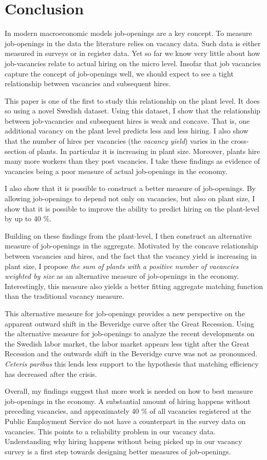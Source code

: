 \section{Conclusion}
\label{sec:conclusion}

In modern macroeconomic models job-openings are a key concept. To measure job-openings in the data the literature relies on vacancy data. Such data is either measured in surveys or in register data. Yet so far we know very little about how job-vacancies relate to actual hiring on the micro level. Insofar that job vacancies capture the concept of job-openings well, we should expect to see a tight relationship between vacancies and subsequent hires.
 
This paper is one of the first to study this relationship on the plant level. It does so using a novel Swedish dataset. Using this dataset, I show that the relationship between job-vacancies and subsequent hires is weak and concave. That is, one additional vacancy on the plant level predicts less and less hiring. I also show that the number of hires per vacancies (the \emph{vacancy yield}) varies in the cross-section of plants. In particular it is increasing in plant size. Moreover, plants hire many more workers than they post vacancies. I take these findings as evidence of vacancies being a poor measure of actual job-openings in the economy. 

I also show that it is possible to construct a better measure of job-openings. By allowing job-openings to depend not only on vacancies, but also on plant size, I show that it is possible to improve the ability to predict hiring on the plant-level by up to 40 \%. 

Building on these findings from the plant-level, I then construct an alternative measure of job-openings in the aggregate. Motivated by the concave relationship between vacancies and hires, and the fact that the vacancy yield is increasing in plant size, I propose \emph{the sum of plants with a positive number of vacancies weighted by size} as an alternative measure of job-openings in the economy. Interestingly, this measure also yields a better fitting aggregate matching function than the traditional vacancy measure.

This alternative measure for job-openings provides a new perspective on the apparent outward shift in the Beveridge curve after the Great Recession. Using the alternative measure for job-openings to analyze the recent developments on the Swedish labor market, the labor market appears less tight after the Great Recession and the outwards shift in the Beveridge curve was not as pronounced. \emph{Ceteris paribus} this lends less support to the hypothesis that matching efficiency has decreased after the crisis. 

Overall, my findings suggest that more work is needed on how to best measure job-openings in the economy. A substantial amount of hiring happens without preceding vacancies, and approximately 40 \% of all vacancies registered at the Public Employment Service do not have a counterpart in the survey data on vacancies. This points to a reliability problem in our vacancy data. Understanding why hiring happens without being picked up in our vacancy survey is a first step towards designing better measures of job-openings.
